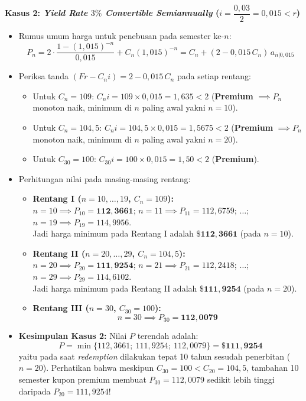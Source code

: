 \documentclass[11pt,a4paper]{article}
\begin{document}
\begin{examplebox}
\medskip
\noindent\textbf{Kasus 2: \textit{Yield Rate} $3\%$ \textit{Convertible Semiannually} ($i = \dfrac{0{,}03}{2} = 0{,}015 < r$)}
\begin{itemize}[topsep=2pt, itemsep=2pt]
    \item Rumus umum harga untuk penebusan pada semester ke-$n$:
    \[
        P_n = 2 \cdot \frac{1 - (1{,}015)^{-n}}{0{,}015} + C_n(1{,}015)^{-n} = C_n + (2 - 0{,}015\,C_n)\,a_{\overline{n}|0{,}015}
    \]
    \item Periksa tanda $(Fr - C_n i) = 2 - 0{,}015\,C_n$ pada setiap rentang:
    \begin{itemize}
        \item Untuk $C_n = 109$: $C_n i = 109 \times 0{,}015 = 1{,}635 < 2$ (\textbf{Premium} $\implies P_n$ monoton naik, minimum di $n$ paling awal yakni $n = 10$).
        \item Untuk $C_n = 104{,}5$: $C_n i = 104{,}5 \times 0{,}015 = 1{,}5675 < 2$ (\textbf{Premium} $\implies P_n$ monoton naik, minimum di $n$ paling awal yakni $n = 20$).
        \item Untuk $C_{30} = 100$: $C_{30} i = 100 \times 0{,}015 = 1{,}50 < 2$ (\textbf{Premium}).
    \end{itemize}
    \item Perhitungan nilai pada masing-masing rentang:
    \begin{itemize}
        \item \textbf{Rentang I ($n = 10, \dots, 19$, $C_n = 109$):}\\
        $n = 10 \implies P_{10} = \mathbf{112{,}3661}$; \quad $n = 11 \implies P_{11} = 112{,}6759$; \quad $\dots$; \quad $n = 19 \implies P_{19} = 114{,}9956$.\\
        Jadi harga minimum pada Rentang I adalah $\mathbf{\$112{,}3661}$ (pada $n = 10$).
        \item \textbf{Rentang II ($n = 20, \dots, 29$, $C_n = 104{,}5$):}\\
        $n = 20 \implies P_{20} = \mathbf{111{,}9254}$; \quad $n = 21 \implies P_{21} = 112{,}2418$; \quad $\dots$; \quad $n = 29 \implies P_{29} = 114{,}6102$.\\
        Jadi harga minimum pada Rentang II adalah $\mathbf{\$111{,}9254}$ (pada $n = 20$).
        \item \textbf{Rentang III ($n = 30$, $C_{30} = 100$):}
        \[
            n = 30 \implies P_{30} = \mathbf{112{,}0079}
        \]
    \end{itemize}
    \item \textbf{Kesimpulan Kasus 2:} Nilai $P$ terendah adalah:
    \[
        P = \min\{112{,}3661;\ 111{,}9254;\ 112{,}0079\} = \mathbf{\$111{,}9254}
    \]
    yaitu pada saat \textit{redemption} dilakukan tepat 10 tahun sesudah penerbitan ($n = 20$). Perhatikan bahwa meskipun $C_{30} = 100 < C_{20} = 104{,}5$, tambahan 10 semester kupon premium membuat $P_{30} = 112{,}0079$ sedikit lebih tinggi daripada $P_{20} = 111{,}9254$!
\end{itemize}
\end{examplebox}
\end{document}
